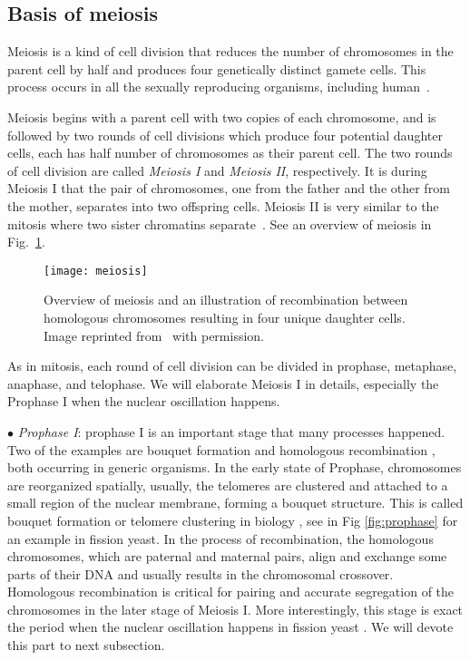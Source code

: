 \subsection{Basis of meiosis}
\label{sub:basis_of_meiosis}

Meiosis is a kind of cell division that reduces the number of chromosomes in the parent cell by half and produces four genetically distinct gamete cells. This process occurs in all the sexually reproducing organisms, including human~\cite{Freeman2008}. 

Meiosis begins with a parent cell with two copies of each chromosome, and is followed by two rounds of cell divisions which produce four potential daughter cells, each has half number of chromosomes as their parent cell. The two rounds of cell division are called \emph{Meiosis I} and \emph{Meiosis II}, respectively. It is during Meiosis I that the pair of chromosomes, one from the father and the other from the mother, separates into two offspring cells. Meiosis II is very similar to the mitosis where two sister chromatins separate~\cite{Freeman2008,Villeneuve2001a}. See an overview of meiosis in Fig.~\ref{fig:meiosis}.

\begin{figure}[htpb]
    \centering
    \texttt{[image: meiosis]}
    \caption{Overview of meiosis and an illustration of recombination between homologous chromosomes resulting in four unique daughter cells. Image reprinted from~\cite{} with permission.}
    \label{fig:meiosis}
\end{figure}

As in mitosis, each round of cell division can be divided in prophase, metaphase, anaphase, and telophase. We will elaborate Meiosis I in details, especially the Prophase I when the nuclear oscillation happens. 

$\bullet$ \emph{Prophase I}: prophase I is an important stage that many processes happened. Two of the examples are bouquet formation \cite{Wegener1980a} and homologous recombination \cite{Davis2001,Gerton2005}, both occurring in generic organisms. In the early state of Prophase, chromosomes are reorganized spatially, usually, the telomeres are clustered and attached to a small region of the nuclear membrane, forming a bouquet structure. This is called bouquet formation or telomere clustering in biology \cite{Chikashige1994,Wegener1980a,Niwa2000}, see in Fig \ref{fig:prophase} for an example in fission yeast. In the process of recombination, the homologous chromosomes, which are paternal and maternal pairs, align and exchange some parts of their DNA and usually results in the chromosomal crossover. Homologous recombination is critical for pairing and accurate segregation of the chromosomes in the later stage of Meiosis I. More interestingly, this stage is exact the period when the nuclear oscillation happens in fission yeast \cite{Ding1998,Wells2006}. We will devote this part to next subsection.

